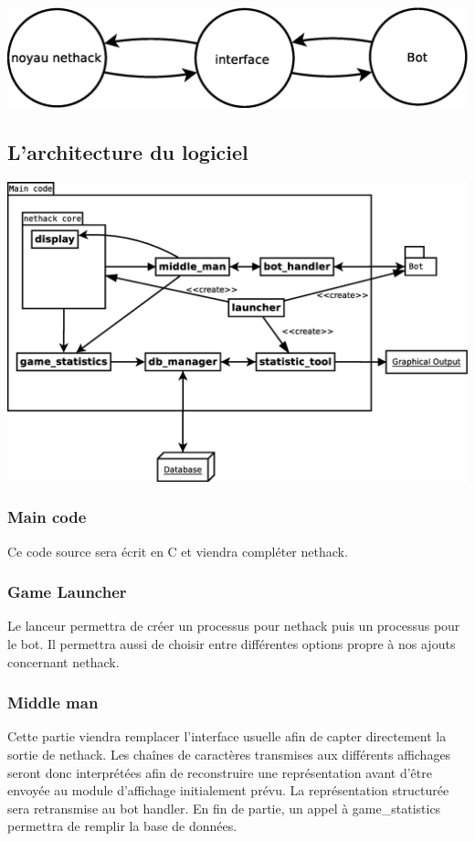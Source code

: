 \documentclass[12pt]{article}
\begin{document}
\begin{center}
  \includegraphics[width=180mm]{diagrammes/proto_archi.eps}
\end{center}

\subsection{L'architecture du logiciel}
\begin{center}
  \includegraphics[width=180mm]{diagrammes/new_archi.eps}
\end{center}

\subsubsection*{Main code}
Ce code source sera écrit en C et viendra compléter nethack.
\subsubsection*{Game Launcher}
Le lanceur permettra de créer un processus pour nethack puis un processus pour le bot. Il permettra aussi de choisir entre différentes options propre à nos ajouts concernant nethack.
\subsubsection*{Middle man}
Cette partie viendra remplacer l'interface usuelle afin de capter directement la sortie de nethack. Les chaînes de caractères transmises aux différents affichages seront donc interprétées afin de reconstruire une représentation avant d'être envoyée au module d'affichage initialement prévu.
La représentation structurée sera retransmise au bot handler. En fin de partie, un appel à game\_statistics permettra de remplir la base de données.
\end{document}
